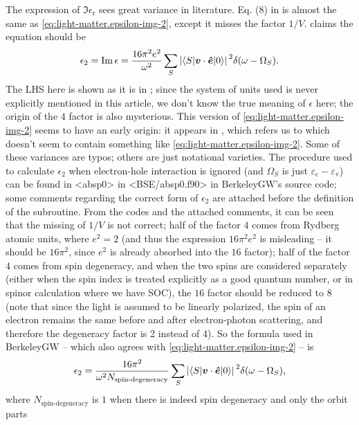 \documentclass[hyperref, a4paper, 12pt]{report}
\def\texttt#1{<#1>}%
\newcommand{\shortcode}[1]{\texttt{#1}}
\newcommand*{\epsr}{\epsilon_{\text{r}}}
\begin{document}
The expression of $\Im \epsr$ sees great variance in literature. 
Eq. (8) in \cite{del1993optical} is almost the same as \eqref{eq:light-matter.epsilon-img-2},
except it misses the factor $1 / V$. 
\cite{berkeleygw} claims the equation should be 
\[
    \epsilon_2 = \Im \epsilon = \frac{16 \pi^2 e^2}{\omega^2 } 
    \sum_S \abs*{\mel**{S}{\vb*{v} \cdot \vu*{e}}{0}}^2 \delta(\omega - \Omega_S).
\]
The LHS here is shown as it is in \cite{berkeleygw}; 
since the system of units used is never explicitly mentioned in this article, 
we don't know the true meaning of $\epsilon$ here;
the origin of the $4$ factor is also mysterious.
This version of \eqref{eq:light-matter.epsilon-img-2} seems to have an early origin:
it appears in \cite{rohlfing2000electron},
which refers us to \cite{adolph1996nonlocality}
which doesn't seem to contain something like \eqref{eq:light-matter.epsilon-img-2}.
Some of these variances are typos; 
others are just notational varieties. 
The procedure used to calculate $\epsilon_2$
when electron-hole interaction is ignored 
(and $\Omega_S$ is just $\varepsilon_{\text{c}} - \varepsilon_{\text{v}}$) 
can be found in 
\shortcode{absp0} in \shortcode{BSE/absp0.f90} in BerkeleyGW's source code;
some comments regarding the correct form of $\epsilon_2$
are attached before the definition of the subroutine.
From the codes and the attached comments, 
it can be seen that 
the missing of $1/V$ is not correct;
half of the factor $4$ comes from Rydberg atomic units, 
where $e^2 = 2$
(and thus the expression $16 \pi^2 e^2$ is misleading -- 
it should be $16 \pi^2$, 
since $e^2$ is already absorbed into the $16$ factor);
half of the factor $4$ comes from spin degeneracy,
and when the two spins are considered separately 
(either when the spin index is treated explicitly as a good quantum number, 
or in spinor calculation where we have SOC),
the $16$ factor should be reduced to $8$
(note that since the light is assumed to be linearly polarized, 
the spin of an electron remains the same 
before and after electron-photon scattering, 
and therefore the degeneracy factor is 2 instead of 4). 
So the formula used in BerkeleyGW 
-- which also agrees with \eqref{eq:light-matter.epsilon-img-2} -- 
is 
\begin{equation}
    \epsilon_2 = \frac{16 \pi^2}{\omega^2 N_{\text{spin-degeneracy}}} 
    \sum_S \abs*{\mel**{S}{\vb*{v} \cdot \vu*{e}}{0}}^2 \delta(\omega - \Omega_S),
\end{equation}
where $N_{\text{spin-degeneracy}}$ is $1$ 
when there is indeed spin degeneracy and only the orbit parts
\end{document}
